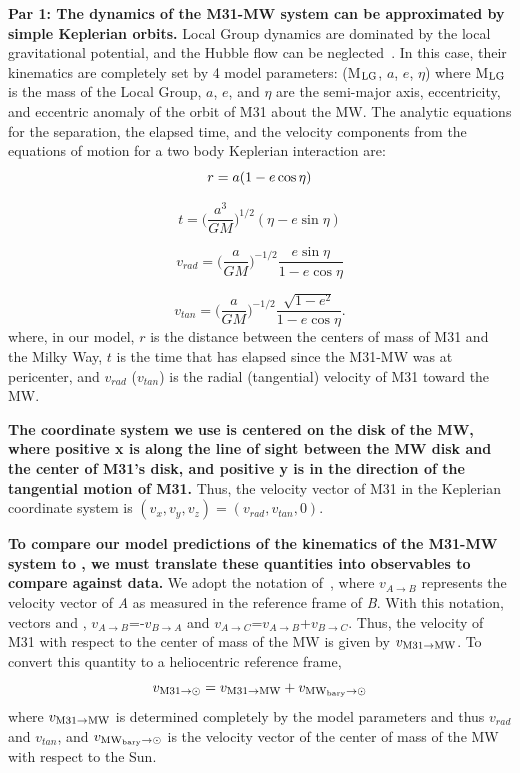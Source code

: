 \documentclass[twocolumn]{aastex631}
\newcommand{\mlg}{M$_{\rm LG}$}
\begin{document}
\textbf{Par 1: The dynamics of the M31-MW system can be approximated by simple Keplerian orbits.}
Local Group dynamics are dominated by the local gravitational potential, and the Hubble flow can be neglected~\cite{}. In this case, their kinematics are completely set by 4 model parameters: (\mlg, $a$, $e$, $\eta$) where \mlg is the mass of the Local Group, $a$, $e$, and $\eta$ are the semi-major axis, eccentricity, and eccentric anomaly of the orbit of M31 about the MW. The analytic equations for the separation, the elapsed time, and the velocity components from the equations of motion for a two body Keplerian interaction are:
\begin{equation}\label{eq:r}
  r = a(1-e\cos\eta)\\
\end{equation}

\begin{equation}\label{eq:t}
  t=\bigg(\frac{a^3}{GM}\bigg)^{1/2}(\eta-e\sin\eta)
\end{equation}

\begin{equation}\label{eq:vrad}
  v_{rad} = \bigg( \frac{a}{GM} \bigg)^{-1/2} \frac{e\sin\eta}{1-e\cos\eta}
\end{equation}

\begin{equation}\label{eq:vtan}
  v_{tan}= \bigg( \frac{a}{GM} \bigg)^{-1/2} \frac{\sqrt{1-e^2}}{1-e\cos\eta}.
\end{equation}
where, in our model, $r$ is the distance between the centers of mass of M31 and the Milky Way, $t$ is the time that has elapsed since the M31-MW was at pericenter, and $v_{rad}$ ($v_{tan}$) is the radial (tangential) velocity of M31 toward the MW. 

\textbf{The coordinate system we use is centered on the disk of the MW, where positive x is along the line of sight between the MW disk and the center of M31's disk, and positive y is in the direction of the tangential motion of M31.} Thus, the velocity vector of M31 in the Keplerian coordinate system is $(v_x, v_y, v_z) =(v_{rad},v_{tan},0)$. 


\textbf{To compare our model predictions of the kinematics of the M31-MW system to , we must translate these quantities into observables to compare against data.}
We adopt the notation of~\cite{Penarrubia2016}, where $v_{A\to B}$ represents the velocity vector of \textit{A} as measured in the reference frame of \textit{B}. With this notation, vectors and , $v_{A\to B}$=-$v_{B\to A}$ and $v_{A\to C}$=$v_{A\to B}$+$v_{B\to C}$. Thus, the velocity of M31 with respect to the center of mass of the MW is given by $v_{\rm M31 \to MW}$. To convert this quantity to a heliocentric reference frame, 
\begin{equation}  
  v_{\rm M31 \to \odot} = v_{\rm M31 \to MW}+v_{\rm MW_{bary} \to \odot}
\end{equation}
where $v_{\rm M31 \to MW}$ is determined completely by the model parameters and thus $v_{rad}$ and $v_{tan}$, and 
$v_{\rm MW_{bary} \to \odot}$ is the velocity vector of the center of mass of the MW with respect to the Sun. 
\end{document}
